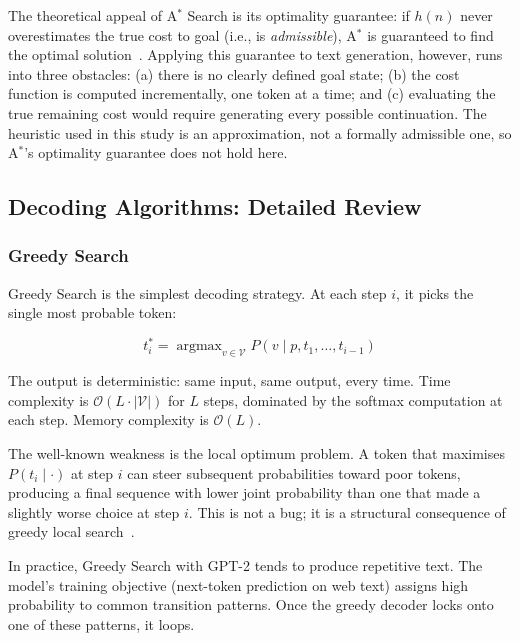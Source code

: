 \documentclass[12pt]{article}
\begin{document}
	The theoretical appeal of A$^*$ Search is its optimality guarantee: if $h(n)$ never overestimates the true cost to goal (i.e., is \emph{admissible}), A$^*$ is guaranteed to find the optimal solution~\cite{hart1968astar}. Applying this guarantee to text generation, however, runs into three obstacles: (a) there is no clearly defined goal state; (b) the cost function is computed incrementally, one token at a time; and (c) evaluating the true remaining cost would require generating every possible continuation. The heuristic used in this study is an approximation, not a formally admissible one, so A$^*$'s optimality guarantee does not hold here.
	
	\subsection{Decoding Algorithms: Detailed Review}
	
	\subsubsection{Greedy Search}
	\label{sec:greedy_theory}
	
	Greedy Search is the simplest decoding strategy. At each step $i$, it picks the single most probable token:
	
	\begin{equation}
		t_i^* = \operatorname{argmax}_{v \in \mathcal{V}} P(v \mid p, t_1, \ldots, t_{i-1})
		\label{eq:greedy}
	\end{equation}
	
	The output is deterministic: same input, same output, every time. Time complexity is $\mathcal{O}(L \cdot |\mathcal{V}|)$ for $L$ steps, dominated by the softmax computation at each step. Memory complexity is $\mathcal{O}(L)$.
	
	The well-known weakness is the local optimum problem. A token that maximises $P(t_i \mid \cdot)$ at step $i$ can steer subsequent probabilities toward poor tokens, producing a final sequence with lower joint probability than one that made a slightly worse choice at step $i$. This is not a bug; it is a structural consequence of greedy local search~\cite{russellnorvig2020ai}.
	
	In practice, Greedy Search with GPT-2 tends to produce repetitive text. The model's training objective (next-token prediction on web text) assigns high probability to common transition patterns. Once the greedy decoder locks onto one of these patterns, it loops.
	
\end{document}

